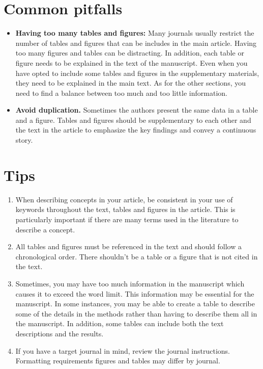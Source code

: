 \documentclass[
]{book}
\providecommand{\tightlist}{%
  \setlength{\itemsep}{0pt}\setlength{\parskip}{0pt}}
\begin{document}
\hypertarget{common-pitfalls-2}{%
\section{Common pitfalls}\label{common-pitfalls-2}}

\begin{itemize}
\tightlist
\item
  \textbf{Having too many tables and figures:} Many journals usually restrict the number of tables and figures that can be includes in the main article. Having too many figures and tables can be distracting. In addition, each table or figure needs to be explained in the text of the manuscript. Even when you have opted to include some tables and figures in the supplementary materials, they need to be explained in the main text. As for the other sections, you need to find a balance between too much and too little information.
\item
  \textbf{Avoid duplication.} Sometimes the authors present the same data in a table and a figure. Tables and figures should be supplementary to each other and the text in the article to emphasize the key findings and convey a continuous story.
\end{itemize}

\hypertarget{tips-2}{%
\section{Tips}\label{tips-2}}

\begin{enumerate}
\def\labelenumi{\arabic{enumi}.}
\tightlist
\item
  When describing concepts in your article, be consistent in your use of keywords throughout the text, tables and figures in the article. This is particularly important if there are many terms used in the literature to describe a concept.
\item
  All tables and figures must be referenced in the text and should follow a chronological order. There shouldn't be a table or a figure that is not cited in the text.
\item
  Sometimes, you may have too much information in the manuscript which causes it to exceed the word limit. This information may be essential for the manuscript. In some instances, you may be able to create a table to describe some of the details in the methods rather than having to describe them all in the manuscript. In addition, some tables can include both the text descriptions and the results.
\item
  If you have a target journal in mind, review the journal instructions. Formatting requirements figures and tables may differ by journal.
\end{enumerate}
\end{document}
